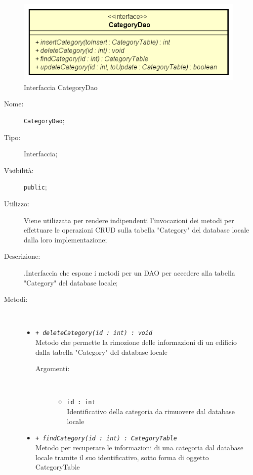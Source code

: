 \documentclass[../DefinizioneDiProdotto.tex]{subfiles}
\begin{document}
    \begin{figure}[H]
        \centering
        \includegraphics{img/CategoryDao.png}
        \caption{Interfaccia CategoryDao}\label{fig:model::dataaccess::dao::CategoryDao} 
    \end{figure}
    \begin{description}
\item[Nome:] \texttt{CategoryDao};
\item[Tipo:] Interfaccia;
\item[Visibilità:] \texttt{public};
\item[Utilizzo:] Viene utilizzata per rendere indipendenti l'invocazioni dei metodi per effettuare le operazioni CRUD sulla tabella "Category" del database locale dalla loro implementazione;
\item[Descrizione:] .Interfaccia che espone i metodi per un DAO per accedere alla tabella "Category" del database locale;
\item[Metodi:] \
\begin{itemize}
\item \texttt{+ \textit{deleteCategory(id : int) : void}}\\
Metodo che permette la rimozione delle informazioni di un edificio dalla tabella "Category" del database locale
 \begin{description}
\item[Argomenti:] \
\begin{itemize}
\item \texttt{id : int}\\
Identificativo della categoria da rimuovere dal database locale\end{itemize}
\end{description}
\item \texttt{+ \textit{findCategory(id : int) : CategoryTable}}\\
Metodo per recuperare le informazioni di una categoria dal database locale tramite il suo identificativo, sotto forma di oggetto CategoryTable
 \begin{description}

\end{description}
\end{itemize}
\end{description}
\end{document}

